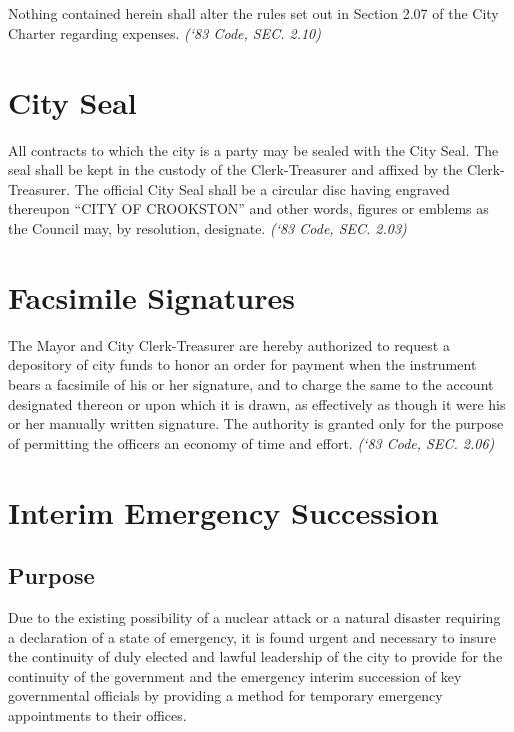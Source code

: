 \subsection{}
Nothing contained herein shall alter the rules set out in Section 2.07 of the City Charter regarding expenses.\newline
\emph{(‘83 Code, SEC. 2.10)}



\section{City Seal}
All contracts to which the city is a party may be sealed with the City Seal.  The seal shall be kept in the custody of the Clerk-Treasurer and affixed by the Clerk-Treasurer.  The official City Seal shall be a circular disc having engraved thereupon “CITY OF CROOKSTON” and other words, figures or emblems as the Council may, by resolution, designate.\newline
\emph{(‘83 Code, SEC. 2.03)}



\section{Facsimile Signatures}
The Mayor and City Clerk-Treasurer are hereby authorized to request a depository of city funds to honor an order for payment when the instrument bears a facsimile of his or her signature, and to charge the same to the account designated thereon or upon which it is drawn, as effectively as though it were his or her manually written signature. The authority is granted only for the purpose of permitting the officers an economy of time and effort.\newline
\emph{(‘83 Code, SEC. 2.06)}



\section{Interim Emergency Succession}
\subsection{Purpose}
Due to the existing possibility of a nuclear attack or a natural disaster requiring a declaration of a state of emergency, it is found urgent and necessary to insure the continuity of duly elected and lawful leadership of the city to provide for the continuity of the government and the emergency interim succession of key governmental officials by providing a method for temporary emergency appointments to their offices.
